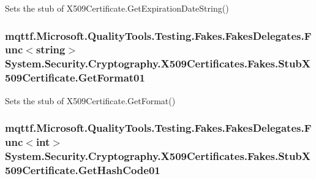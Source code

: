Sets the stub of X509\-Certificate.\-Get\-Expiration\-Date\-String()

\hypertarget{class_system_1_1_security_1_1_cryptography_1_1_x509_certificates_1_1_fakes_1_1_stub_x509_certificate_a876a26997492042094a69300696533e4}{
\subsubsection[{Get\-Format01}]{\setlength{\rightskip}{0pt plus 5cm}mqttf.\-Microsoft.\-Quality\-Tools.\-Testing.\-Fakes.\-Fakes\-Delegates.\-Func$<$string$>$ System.\-Security.\-Cryptography.\-X509\-Certificates.\-Fakes.\-Stub\-X509\-Certificate.\-Get\-Format01}}\label{class_system_1_1_security_1_1_cryptography_1_1_x509_certificates_1_1_fakes_1_1_stub_x509_certificate_a876a26997492042094a69300696533e4}


Sets the stub of X509\-Certificate.\-Get\-Format()

\hypertarget{class_system_1_1_security_1_1_cryptography_1_1_x509_certificates_1_1_fakes_1_1_stub_x509_certificate_add51554878e96465b83736e88f6c188c}{
\subsubsection[{Get\-Hash\-Code01}]{\setlength{\rightskip}{0pt plus 5cm}mqttf.\-Microsoft.\-Quality\-Tools.\-Testing.\-Fakes.\-Fakes\-Delegates.\-Func$<$int$>$ System.\-Security.\-Cryptography.\-X509\-Certificates.\-Fakes.\-Stub\-X509\-Certificate.\-Get\-Hash\-Code01}}\label{class_system_1_1_security_1_1_cryptography_1_1_x509_certificates_1_1_fakes_1_1_stub_x509_certificate_add51554878e96465b83736e88f6c188c}


